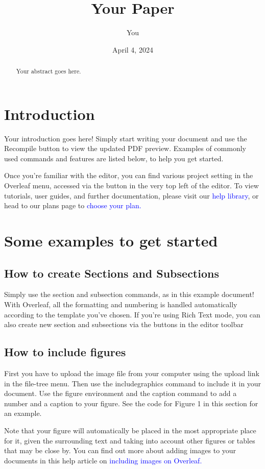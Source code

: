 \documentclass{article}
\title{Your Paper}
\author{You}
\date{April 4, 2024}
\begin{document}
	\maketitle
	
	\begin{abstract}
		Your abstract goes here.
	\end{abstract}
	
	\section{Introduction}
	Your introduction goes here! Simply start writing your document and use the Recompile button to
	view the updated PDF preview. Examples of commonly used commands and features are listed below,
	to help you get started.
	
	Once you’re familiar with the editor, you can find various project setting in the Overleaf menu,
	accessed via the button in the very top left of the editor. To view tutorials, user guides, and further
	documentation, please visit our \textcolor{blue}{help library}, or head to our plans page to \textcolor{blue}{choose your plan.}
	
	\section{Some examples to get started}
	\subsection{How to create Sections and Subsections}
	Simply use the section and subsection commands, as in this example document! With Overleaf, all
	the formatting and numbering is handled automatically according to the template you’ve chosen. If
	you’re using Rich Text mode, you can also create new section and subsections via the buttons in the
	editor toolbar
	
	\subsection{How to include figures}
	First you have to upload the image file from your computer using the upload link in the file-tree menu. Then use the includegraphics command to include it in your document. Use the figure environment and the caption command to add a number and a caption to your figure. See the code for Figure 1 in this section for an example.\par{} Note that your figure will automatically be placed in the most appropriate place for it, given the surrounding text and taking into account other figures or tables that may be close by. You can find out more about adding images to your documents in this help article on \textcolor{blue}{including images on Overleaf.}
	
\end{document}
